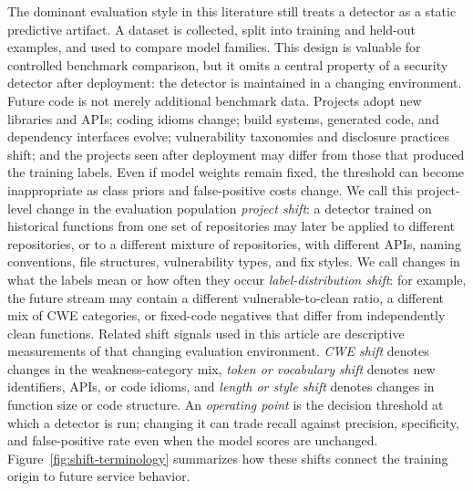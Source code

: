 \documentclass[a4paper,fleqn]{cas-dc}
\begin{document}
The dominant evaluation style in this literature still treats a detector as a
static predictive artifact. A dataset is collected, split into training and
held-out examples, and used to compare model families. This design is valuable
for controlled benchmark comparison, but it omits a central property of a
security detector after deployment: the detector is maintained in a changing
environment. Future code is not merely additional benchmark data. Projects adopt
new libraries and APIs; coding idioms change; build systems, generated code, and
dependency interfaces evolve; vulnerability taxonomies and disclosure practices
shift; and the projects seen after deployment may differ from those that
produced the training labels. Even if model weights remain fixed, the threshold
can become inappropriate as class priors and false-positive costs change.
We call this project-level change in the evaluation population
\emph{project shift}:
a detector trained on historical functions from one set of
repositories may later be applied to different repositories, or to a different
mixture of repositories, with different APIs, naming conventions, file
structures, vulnerability types, and fix styles.
We call changes in what the labels mean or how often they occur
\emph{label-distribution shift}: for example, the future stream may contain a
different vulnerable-to-clean ratio, a different mix of CWE categories, or
fixed-code negatives that differ from independently clean functions. Related shift signals
used in this article are descriptive measurements of that changing evaluation
environment. \emph{CWE shift} denotes changes in the weakness-category mix,
\emph{token or vocabulary shift} denotes new identifiers, APIs, or code idioms,
and \emph{length or style shift} denotes changes in function size or code
structure. An \emph{operating point} is the decision threshold at which a
detector is run; changing it can trade recall against precision, specificity,
and false-positive rate even when the model scores are unchanged.
Figure~\ref{fig:shift-terminology} summarizes how these shifts connect the
training origin to future service behavior.
\end{document}
